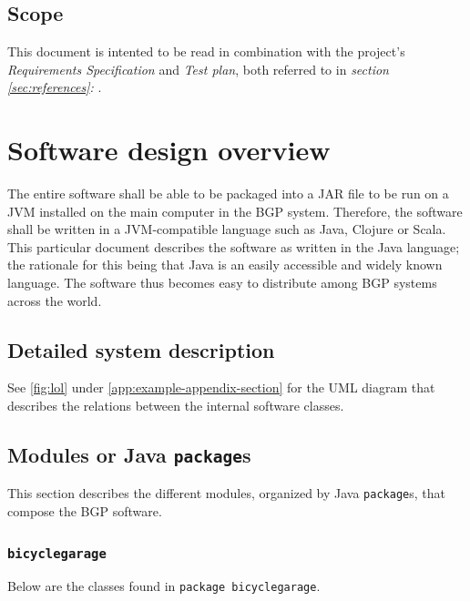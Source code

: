 \documentclass[12pt,titlepage]{article}
\begin{document}
\subsection{Scope}
\label{subsec:introduction-scope}

This document is intented to be read in combination with the project's
\textit{Requirements Specification} and \textit{Test plan}, both
referred to in \textit{section \ref{sec:references}: }.



\section{Software design overview}

The entire software shall be able to be packaged into a JAR file to be run on a
JVM installed on the main computer in the BGP system. Therefore, the software
shall be written in a JVM-compatible language such as Java, Clojure or Scala.
This particular document describes the software as written in the Java language;
the rationale for this being that Java is an easily accessible and widely known
language. The software thus becomes easy to distribute among BGP systems across
the world.

\subsection{Detailed system description}
\label{sec:detailed-system-description}

See \cref{fig:lol} under \cref{app:example-appendix-section} for the UML diagram that describes the relations between the internal software classes.

\subsection{Modules or Java \texttt{package}s}

This section describes the different modules, organized by Java
\texttt{package}s, that compose the BGP software.

\subsubsection{\texttt{bicyclegarage}}

Below are the classes found in \texttt{package bicyclegarage}.
\end{document}
